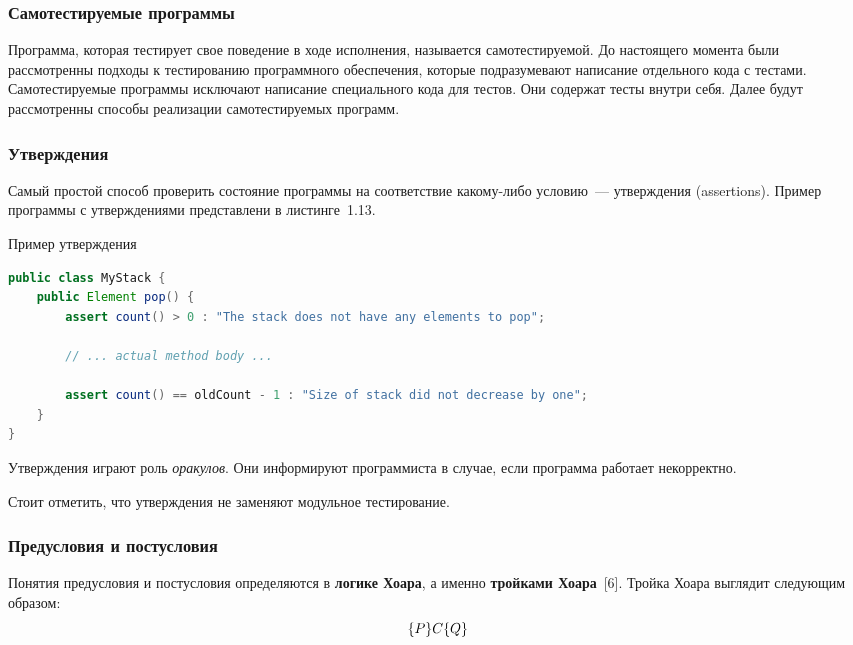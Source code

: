 \subsubsection{Самотестируемые программы}

Программа, которая тестирует свое поведение в ходе исполнения, называется самотестируемой. До настоящего момента были рассмотренны подходы к тестированию программного обеспечения, которые подразумевают написание отдельного кода с тестами. Самотестируемые программы исключают написание специального кода для тестов. Они содержат тесты внутри себя.  Далее будут рассмотренны способы реализации самотестируемых программ.

\subsubsection{Утверждения}

Самый простой способ проверить состояние программы на соответствие какому-либо условию~--- утверждения (assertions). Пример программы с утверждениями представлени в листинге~1.13.

\begin{ListingEnv}[!h]%
	\captiondelim{ } %
	\caption{Пример утверждения}
	\begin{lstlisting}[language={Java}]
public class MyStack {
	public Element pop() {
		assert count() > 0 : "The stack does not have any elements to pop";
		
		// ... actual method body ...
		
		assert count() == oldCount - 1 : "Size of stack did not decrease by one";
	}
}
	\end{lstlisting}
\end{ListingEnv}%


Утверждения играют роль \textit{оракулов}. Они информируют программиста в случае, если программа работает некорректно. 

Стоит отметить, что утверждения не заменяют модульное тестирование. 


\subsubsection{Предусловия и постусловия}	

Понятия предусловия и постусловия определяются в \textbf{логике Хоара}, а именно \textbf{тройками Хоара}~[6]. Тройка Хоара выглядит следующим образом: \[\{P\} \space C \space \{Q\}\]


